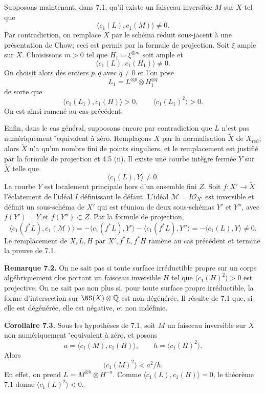 \documentclass[11pt]{article}
\providecommand{\Q}{\mathbb Q}
\begin{document}
Supposons maintenant, dans 7.1, qu'il existe un faisceau inversible $M$ sur $X$ tel que
\[
   \langle c_1(L),c_1(M)\rangle\ne0.
\]
Par contradiction, on remplace $X$ par le sch\'ema r\'eduit sous-jacent \`a une pr\'esentation de Chow; ceci est permis par la formule de projection. Soit $\xi$ ample sur $X$. Choisissons $m>0$ tel que $H_1=\xi^{\otimes m}$ soit ample et
\[
   \langle c_1(L),c_1(H_1)\rangle\ne0.
\]
On choisit alors des entiers $p,q$ avec $q\ne0$ et l'on pose
\[
   L_1=L^{\otimes p}\otimes H_1^{\otimes q}
\]
de sorte que
\[
   \langle c_1(L_1),c_1(H)\rangle>0,
   \qquad
   \langle c_1(L_1)^2\rangle>0.
\]
On est ainsi ramen\'e au cas pr\'ec\'edent.

Enfin, dans le cas g\'en\'eral, supposons encore par contradiction que $L$ n'est pas num\'eriquement \='equivalent \`a z\'ero. Rempla\c{c}ons $X$ par la normalisation $\widetilde X$ de $X_{\mathrm{red}}$; alors $\widetilde X$ n'a qu'un nombre fini de points singuliers, et le remplacement est justifi\'e par la formule de projection et 4.5 (ii). Il existe une courbe int\`egre ferm\'ee $Y$ sur $\widetilde X$ telle que
\[
   \langle c_1(L),Y\rangle\ne0.
\]
La courbe $Y$ est localement principale hors d'un ensemble fini $Z$. Soit $f:X'\to\widetilde X$ l'\'eclatement de l'id\'eal $I$ d\'efinissant le d\'efaut. L'id\'eal $\mathcal M=I\mathcal O_{X'}$ est inversible et d\'efinit un sous-sch\'ema de $X'$ qui est r\'eunion de deux sous-sch\'emas $Y'$ et $Y''$, avec $f(Y')=Y$ et $f(Y'')\subset Z$. Par la formule de projection,
\[
 \langle c_1(f^*L),c_1(\mathcal M)\rangle
 =-\langle c_1(f^*L),Y'\rangle-\langle c_1(f^*L),Y''\rangle
 =-\langle c_1(L),Y\rangle\ne0.
\]
Le remplacement de $X,L,H$ par $X',f^*L,f^*H$ ram\`ene au cas pr\'ec\'edent et termine la preuve de 7.1.

\textbf{Remarque 7.2.} On ne sait pas si toute surface irr\'eductible propre sur un corps alg\'ebriquement clos portant un faisceau inversible $H$ tel que $\langle c_1(H)^2\rangle>0$ est projective. On ne sait pas non plus si, pour toute surface propre irr\'eductible, la forme d'intersection sur $\NS(X)\otimes\Q$ est non d\'eg\'en\'er\'ee. Il r\'esulte de 7.1 que, si elle est d\'eg\'en\'er\'ee, elle est n\'egative, et non ind\'efinie.

\textbf{Corollaire 7.3.} Sous les hypoth\`eses de 7.1, soit $M$ un faisceau inversible sur $X$ non num\'eriquement \='equivalent \`a z\'ero, et posons
\[
   a=\langle c_1(M),c_1(H)\rangle,
   \qquad
   h=\langle c_1(H)^2\rangle.
\]
Alors
\[
   \langle c_1(M)^2\rangle<a^2/h.
\]
En effet, on prend $L=M^{\otimes h}\otimes H^{-a}$. Comme $\langle c_1(L),c_1(H)\rangle=0$, le th\'eor\`eme 7.1 donne $\langle c_1(L)^2\rangle<0$.
\end{document}
